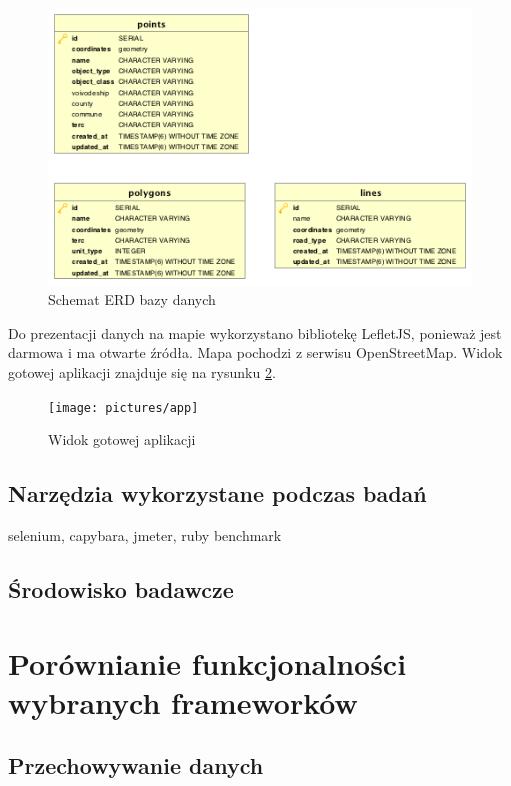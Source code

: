 \documentclass[printmode]{mgr}
\begin{document}
\begin{figure}[H]
  \centering
  \includegraphics[width=1\linewidth]{pictures/erd}
  \caption{Schemat ERD bazy danych}
  \label{fig:erd}
\end{figure}

Do prezentacji danych na mapie wykorzystano bibliotekę LefletJS, ponieważ jest darmowa i ma otwarte źródła. Mapa pochodzi z serwisu OpenStreetMap. Widok gotowej aplikacji znajduje się na rysunku \ref{fig:app}.

\begin{figure}[H]
  \centering
  \texttt{[image: pictures/app]}
  \caption{Widok gotowej aplikacji}
  \label{fig:app}
\end{figure}

\subsection{Narzędzia wykorzystane podczas badań}
selenium, capybara, jmeter, ruby benchmark

\subsection{Środowisko badawcze}

\section{Porównianie funkcjonalności wybranych frameworków}

\subsection{Przechowywanie danych}
\end{document}
